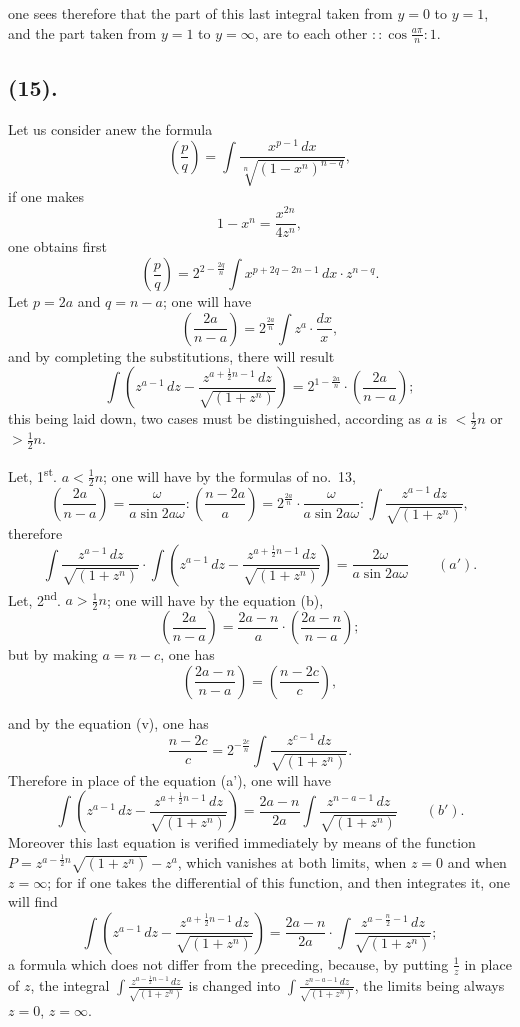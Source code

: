 \documentclass{article}
\begin{document}
one sees therefore that the part of this last integral taken from $y=0$ to $y=1$, and the part taken from $y=1$ to $y=\infty$, are to each other $::\cos\frac{a\pi}{n}:1$.

\subsection*{(15).}

Let us consider anew the formula
\[ \left(\frac{p}{q}\right)=\int\frac{x^{p-1}\,dx}{\sqrt[n]{(1-x^{n})^{n-q}}}, \]
if one makes
\[ 1-x^{n}=\frac{x^{2n}}{4z^{n}}, \]
one obtains first
\[ \left(\frac{p}{q}\right)=2^{2-\frac{2q}{n}}\int x^{p+2q-2n-1}\,dx\cdot z^{n-q}. \]
Let $p=2a$ and $q=n-a$; one will have
\[ \left(\frac{2a}{n-a}\right)=2^{\frac{2a}{n}}\int z^{a}\cdot\frac{dx}{x}, \]
and by completing the substitutions, there will result
\[ \int\left(z^{a-1}\,dz-\frac{z^{a+\frac{1}{2}n-1}\,dz}{\sqrt{(1+z^{n})}}\right)=2^{1-\frac{2a}{n}}\cdot\left(\frac{2a}{n-a}\right); \]
this being laid down, two cases must be distinguished, according as $a$ is $<\frac{1}{2}n$ or $>\frac{1}{2}n$.

Let, 1\textsuperscript{st}. $a<\frac{1}{2}n$; one will have by the formulas of no.~13,
\[ \left(\frac{2a}{n-a}\right)=\frac{\omega}{a\sin 2a\omega}:\left(\frac{n-2a}{a}\right)=2^{\frac{2a}{n}}\cdot\frac{\omega}{a\sin 2a\omega}:\int\frac{z^{a-1}\,dz}{\sqrt{(1+z^{n})}}, \]
therefore
\[ \int\frac{z^{a-1}\,dz}{\sqrt{(1+z^{n})}}\cdot\int\left(z^{a-1}\,dz-\frac{z^{a+\frac{1}{2}n-1}\,dz}{\sqrt{(1+z^{n})}}\right)=\frac{2\omega}{a\sin 2a\omega}\qquad(a'). \]
Let, 2\textsuperscript{nd}. $a>\frac{1}{2}n$; one will have by the equation (b),
\[ \left(\frac{2a}{n-a}\right)=\frac{2a-n}{a}\cdot\left(\frac{2a-n}{n-a}\right); \]
but by making $a=n-c$, one has
\[ \left(\frac{2a-n}{n-a}\right)=\left(\frac{n-2c}{c}\right), \]

and by the equation (v), one has
\[ \frac{n-2c}{c}=2^{-\frac{2c}{n}}\int\frac{z^{c-1}\,dz}{\sqrt{(1+z^{n})}}. \]
Therefore in place of the equation (a'), one will have
\[ \int\left(z^{a-1}\,dz-\frac{z^{a+\frac{1}{2}n-1}\,dz}{\sqrt{(1+z^{n})}}\right)=\frac{2a-n}{2a}\int\frac{z^{n-a-1}\,dz}{\sqrt{(1+z^{n})}}\qquad(b'). \]
Moreover this last equation is verified immediately by means of the function $P=z^{a-\frac{1}{2}n}\sqrt{(1+z^{n})}-z^{a}$, which vanishes at both limits, when $z=0$ and when $z=\infty$; for if one takes the differential of this function, and then integrates it, one will find
\[ \int\left(z^{a-1}\,dz-\frac{z^{a+\frac{1}{2}n-1}\,dz}{\sqrt{(1+z^{n})}}\right)=\frac{2a-n}{2a}\cdot\int\frac{z^{a-\frac{n}{2}-1}\,dz}{\sqrt{(1+z^{n})}}; \]
a formula which does not differ from the preceding, because, by putting $\frac{1}{z}$ in place of $z$, the integral $\displaystyle\int\frac{z^{a-\frac{1}{2}n-1}\,dz}{\sqrt{(1+z^{n})}}$ is changed into $\displaystyle\int\frac{z^{n-a-1}\,dz}{\sqrt{(1+z^{n})}}$, the limits being always $z=0$, $z=\infty$.
\end{document}
